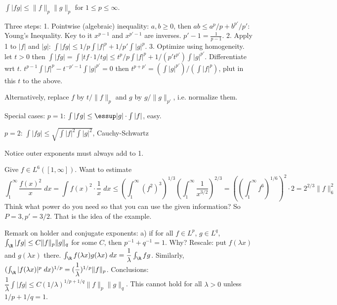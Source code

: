 
\begin{thm}
$\int |fg| \leq \|f\|_p \|g\|_p$ for $1 \leq p \leq \infty$. 
\end{thm}

\pf Three steps: 
1. Pointwise (algebraic) inequality: $a,b \geq 0$, then $ab \leq a^p/p + b^{p'}/p'$: Young's Inequality. Key to it $x^{p-1}$ and $x^{p'-1}$ are inverses. $p'-1 = \frac{1}{p-1}$. 
2. Apply 1 to $|f|$ and $|g|$: $\int |fg| \leq 1/p \int |f|^p + 1/p' \int |g|^p$. 
3. Optimize using homogeneity. let $t>0$ then $\int |fg|= \int |tf \cdot 1/t g| \leq t^p/p \int |f|^p + 1/(p' t^{p'}) \int |g|^{p'}$. Differentiate wrt $t$. $t^{p-1} \int |f|^p- t^{-p'-1} \int |g|^{p'} = 0$ then $t^{p+p'}= (\int |g|^{p'})/(\int |f|^p)$, plut in this $t$ to the above. 

Alternatively, replace $f$ by $t/\|f\|_p$ and $g$ by $g/\|g\|_{p'}$, i.e. normalize them. 






Special cases: $p=1$: $\int |fg| \leq \essup |g| \cdot \int |f|$, easy.

$p=2$: $\int |fg| \leq \sqrt{\int |f|^2 \int |g|^2}$, Cauchy-Schwartz

Notice outer exponents must always add to 1. 


\begin{ex}
Give $f \in L^6([1,\infty])$. Want to estimate
	\[
	\int_1^\infty \dfrac{f(x)^2}{x} \; dx = \int f(x)^2 \cdot \dfrac{1}{x} \; dx  \leq \left(\int_1^\infty (f^2)^3 \right)^{1/3} \left( \int_1^\infty \dfrac{1}{x^{3/2}} \right)^{2/3}= \left(\left(\int_1^\infty f^6 \right)^{1/6} \right)^2 \cdot 2= 2^{2/3} \|f\|_6^2
	\]
Think what power do you need so that you can use the given information? So $P=3, p'= 3/2$. That is the idea of the example. 
\end{ex}







Remark on holder and conjugate exponents:
a) if for all $f \in L^p$, $g \in L^q$, $\int_\R |fg| \leq C \|f\|_p \|g\|_q$ for some $C$, then $p^{-1}+q^{-1}=1$. Why? Rescale: put $f(\lambda x)$ and $g(\lambda x)$ there. $\int_\R f(\lambda x) g(\lambda x) \; dx = \dfrac{1}{\lambda} \int_\R fg$. Similarly, $(\int_\R |f(\lambda x)|^p \; dx)^{1/p}= (\dfrac{1}{\lambda})^{1/p} \|f\|_p$. Conclusions: $\dfrac{1}{\lambda} \int |fg| \leq C (1/\lambda)^{1/p+1/q} \|f\|_p \|g\|_q$. This cannot hold for all $\lambda>0$ unless $1/p+1/q=1$. 

